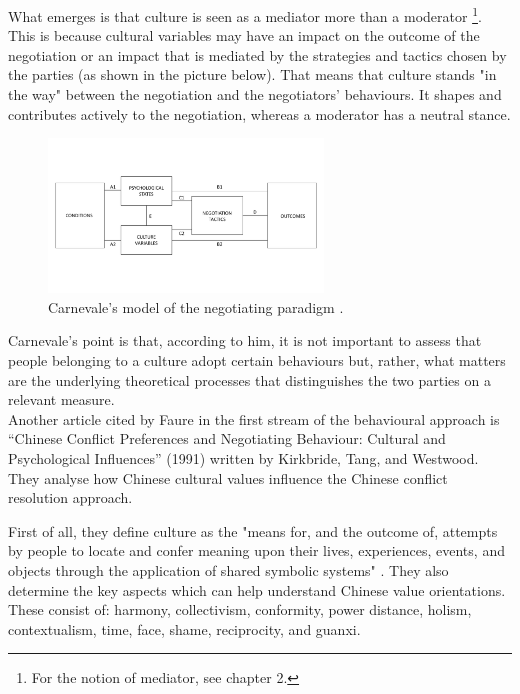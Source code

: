 \documentclass[../main.tex]{subfiles}
\begin{document}
What emerges is that culture is seen as a mediator more than a moderator \autocite[321]{carnevale}\footnote{For the notion of mediator, see chapter 2.}. This is because cultural variables may have an impact on the outcome of the negotiation or an impact that is mediated by the strategies and tactics chosen by the parties (as shown in the picture below). That means that culture stands "in the way" between the negotiation and the negotiators' behaviours. It shapes and contributes actively to the negotiation, whereas a moderator has a neutral stance.

\begin{figure}[h]
    \centering\includegraphics[trim= 1cm 2cm 2cm 1.5cm, width= 0.65\textwidth]{images/property.pdf}
    \caption{Carnevale's model of the negotiating paradigm \autocite[321]{carnevale}.}
\end{figure}

Carnevale's point is that, according to him, it is not important to assess that people belonging to a culture adopt certain behaviours but, rather, what matters are the underlying theoretical processes that distinguishes the two parties on a relevant measure.\\

Another article cited by Faure in the first stream of the behavioural approach is “Chinese Conflict Preferences and Negotiating Behaviour: Cultural and Psychological Influences” (1991) written by Kirkbride, Tang, and Westwood. They analyse how Chinese cultural values influence the Chinese conflict resolution approach.

First of all, they define culture as the "means for, and the outcome of, attempts by people to locate and confer meaning upon their lives, experiences, events, and objects through the application of shared symbolic systems" \autocite[366]{tang}. They also determine the key aspects which can help understand Chinese value orientations. These consist of: harmony, collectivism, conformity, power distance, holism, contextualism, time, face, shame, reciprocity, and guanxi.
\end{document}
